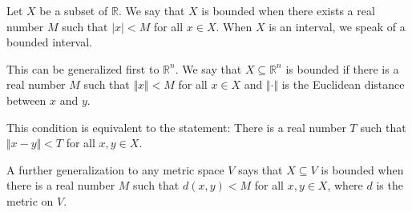 \documentclass[12pt]{article}
\newcommand{\R}{\mathbb{R}}
\begin{document}

Let $X$ be a subset of $\R$. We say that $X$ is bounded when there exists a real number $M$ such that $|x|<M$ for all $x\in X$. When $X$ is an interval, we speak of a bounded interval.

This can be generalized first to $\R^n$. We say  that $X\subseteq \R^n$ is bounded if there is a real number $M$ such that $\Vert x\Vert<M$ for all $x\in X$ and $\Vert\cdot\Vert$ is the Euclidean distance between $x$ and $y$.

This condition is equivalent to the statement: There is a real number $T$ such that $\Vert x-y\Vert<T$ for all $x,y\in X$.

A further generalization to any metric space $V$ says that $X\subseteq V$ is bounded when there is a real number $M$ such that $d(x,y)<M$ for all $x,y\in X$, where $d$ is the metric on $V$.
\end{document}
